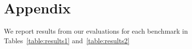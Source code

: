 \section{Appendix}
\label{sec:appendix}
We report results from our evaluations for each benchmark in Tables~\ref{table:results1} and~\ref{table:results2}
%




